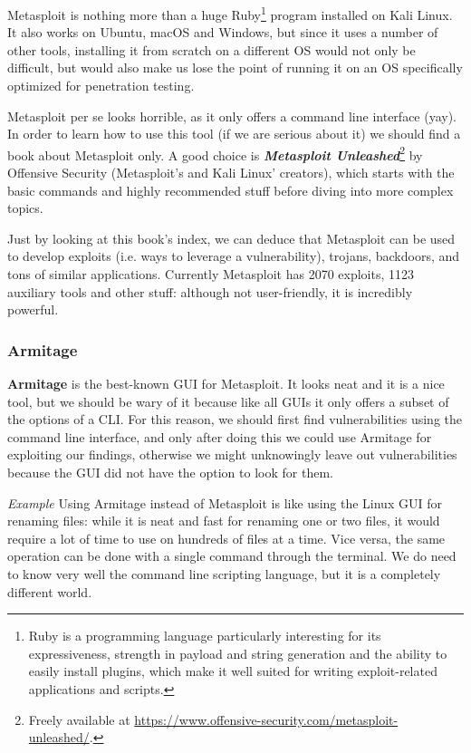 Metasploit is nothing more than a huge Ruby\footnote{Ruby is a programming language particularly interesting for its expressiveness, strength in payload and string generation and the ability to easily install plugins, which make it well suited for writing exploit-related applications and scripts.} program installed on Kali Linux. It also works on Ubuntu, macOS and Windows, but since it uses a number of other tools, installing it from scratch on a different OS would not only be difficult, but would also make us lose the point of running it on an OS specifically optimized for penetration testing. 

Metasploit per se looks horrible, as it only offers a command line interface (yay). In order to learn how to use this tool (if we are serious about it) we should find a book about Metasploit only. A good choice is \textbf{\textit{Metasploit Unleashed}}\footnote{Freely available at \url{https://www.offensive-security.com/metasploit-unleashed/}.} by Offensive Security (Metasploit’s and Kali Linux’ creators), which starts with the basic commands and highly recommended stuff before diving into more complex topics.
 
Just by looking at this book’s index, we can deduce that Metasploit can be used to develop exploits (i.e. ways to leverage a vulnerability), trojans, backdoors, and tons of similar applications. Currently Metasploit has 2070 exploits, 1123 auxiliary tools and other stuff: although not user-friendly, it is incredibly powerful.


\subsubsection{Armitage}
\textbf{Armitage} is the best-known GUI for Metasploit. It looks neat and it is a nice tool, but we should be wary of it because like all GUIs it only offers a subset of the options of a CLI. For this reason, we should first find vulnerabilities using the command line interface, and only after doing this we could use Armitage for exploiting our findings, otherwise we might unknowingly leave out vulnerabilities because the GUI did not have the option to look for them.

\vspace{0.5em}

\emph{Example} Using Armitage instead of Metasploit is like using the Linux GUI for renaming files: while it is neat and fast for renaming one or two files, it would require a lot of time to use on hundreds of files at a time. Vice versa, the same operation can be done with a single command through the terminal. We do need to know very well the command line scripting language, but it is a completely different world.

